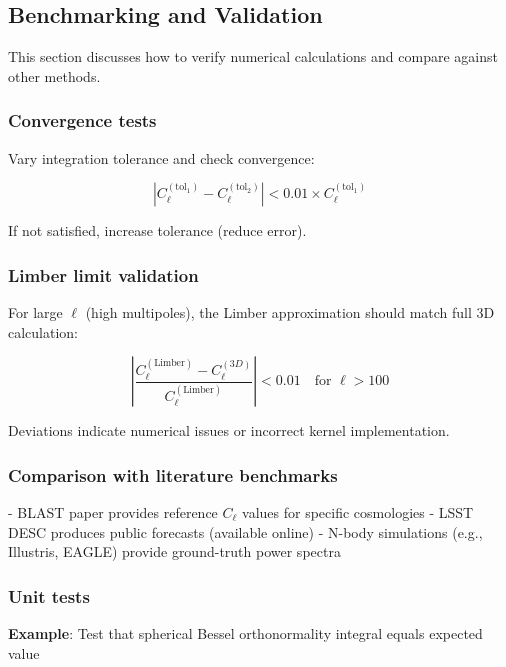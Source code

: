 \subsection{Benchmarking and Validation}\label{subsec:num_benchmarking}

This section discusses how to verify numerical calculations and compare against other methods.

\subsubsection{Convergence tests}

Vary integration tolerance and check convergence:

\begin{equation}
\left| C_\ell^{(\text{tol}_1)} - C_\ell^{(\text{tol}_2)} \right| < 0.01 \times C_\ell^{(\text{tol}_1)}
\end{equation}

If not satisfied, increase tolerance (reduce error).

\subsubsection{Limber limit validation}

For large $\ell$ (high multipoles), the Limber approximation should match full 3D calculation:

\begin{equation}
\left| \frac{C_\ell^{(\text{Limber})} - C_\ell^{(3D)}}{C_\ell^{(\text{Limber})}} \right| < 0.01 \quad \text{for } \ell > 100
\end{equation}

Deviations indicate numerical issues or incorrect kernel implementation.

\subsubsection{Comparison with literature benchmarks}

- BLAST paper provides reference $C_\ell$ values for specific cosmologies
- LSST DESC produces public forecasts (available online)
- N-body simulations (e.g., Illustris, EAGLE) provide ground-truth power spectra

\subsubsection{Unit tests}

\textbf{Example}: Test that spherical Bessel orthonormality integral equals expected value

